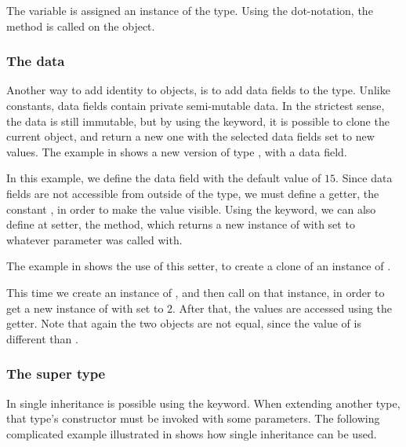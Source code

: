 
The variable  is assigned an instance of the  type. Using
the dot-notation, the method  is called on the object.

\subsubsection{The data}

Another way to add identity to objects, is to add data fields to the type.
Unlike constants, data fields contain private semi-mutable data. In the
strictest sense, the data is still immutable, but by using the
 keyword, it is possible to clone the current object, and return a
new one with the selected data fields set to new values. The example in
 shows a new version of type , with a data field.


In this example, we define the data field  with the default value
of $15$. Since data fields are not accessible from outside of the type, we must
define a getter, the constant , in order to make the value
visible. Using the  keyword, we can also define at setter, the
 method, which returns a new instance of  with
 set to whatever parameter  was called with.

The example in  shows the use of this setter, to create a clone of an
instance of .


This time we create an instance of , and then call 
on that instance, in order to get a new instance of  with 
set to $2$. After that, the values are accessed using the getter. Note that
again the two objects are not equal, since the value of  is
different than .

\subsubsection{The super type}

In \productname{} single inheritance is possible using the
 keyword. When extending another type, that type's constructor
must be invoked with some parameters. The following complicated example
illustrated in  shows how single inheritance can be used.

